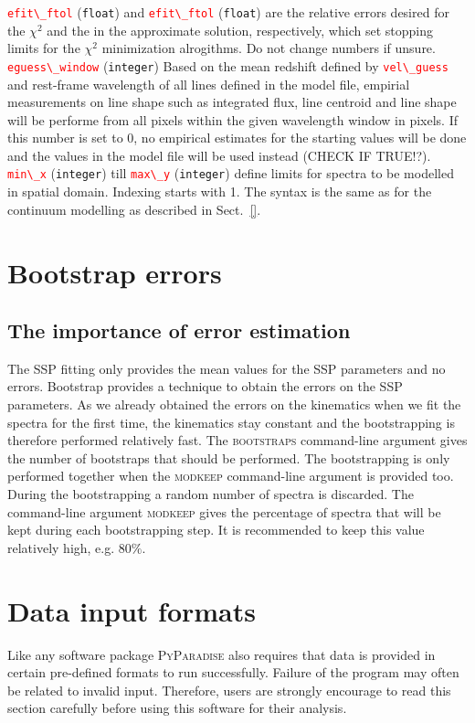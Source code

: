 \documentclass[usenatbib,usegraphicx,useAMS,onecolumn]{mn2e}
\newcommand{\codeline}[1]{\lstinline|#1|}
\newcommand{\paramdef}[1]{\textcolor{red}{\codeline{#1}}}
\begin{document}
\paramdef{efit\_ftol} (\texttt{float}) and \paramdef{efit\_ftol} (\texttt{float}) are the relative errors desired for the $\chi^2$ and the in the approximate solution, respectively, which set stopping limits for the $\chi^2$ minimization alrogithms. Do not change numbers if unsure.\\
\paramdef{eguess\_window} (\texttt{integer}) Based on the mean redshift defined by \paramdef{vel\_guess} and rest-frame wavelength of all lines defined in the model file, empirial measurements on line shape such as integrated flux, line centroid and line shape will be performe from all pixels within the given wavelength window in pixels. If this number is set to 0, no empirical estimates for the starting values will be done and the values in the model file will be used instead (CHECK IF TRUE!?).\\
\paramdef{min\_x} (\texttt{integer})  till \paramdef{max\_y} (\texttt{integer}) define limits for spectra to be modelled in spatial domain. Indexing starts with 1. The syntax is the same as for the continuum modelling as described in Sect.~\ref{}.\\

\section{Bootstrap errors}
\label{sec:bootstrap}
\subsection{The importance of error estimation}
\label{subsec:bootstrap_info}
The SSP fitting only provides the mean values for the SSP parameters and no errors.
Bootstrap provides a technique to obtain the errors on the SSP parameters.
As we already obtained the errors on the kinematics when we fit the spectra for the first time, the kinematics stay constant and the bootstrapping is therefore performed relatively fast.
The \textsc{bootstraps} command-line argument gives the number of bootstraps that should be performed.
The bootstrapping is only performed together when the \textsc{modkeep} command-line argument is provided too.
During the bootstrapping a random number of spectra is discarded.
The command-line argument \textsc{modkeep} gives the percentage of spectra that will be kept during each bootstrapping step.
It is recommended to keep this value relatively high, e.g. 80$\%$.

\section{Data input formats}
\label{sec:data}
Like any software package \textsc{PyParadise} also requires that data is provided in certain pre-defined formats to run successfully.
Failure of the program may often be related to invalid input. 
Therefore, users are strongly encourage to read this section carefully before using this software for their analysis. 
\end{document}
